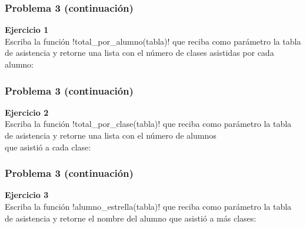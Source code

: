 \documentclass[12pt]{beamer}
\begin{document}
  \begin{frame}
    \frametitle{Problema 3 (continuación)}
    \label{problema-asistencia-2}
    \textbf{Ejercicio 1} \\
    Escriba la función \li!total_por_alumno(tabla)!
    que reciba como parámetro la tabla de asistencia
    y retorne una lista con el número de clases
    asistidas por cada alumno:
    
  \end{frame}

  \begin{frame}
    \frametitle{Problema 3 (continuación)}
    \label{problema-asistencia-3}
    \textbf{Ejercicio 2} \\
    Escriba la función \li!total_por_clase(tabla)!
    que reciba como parámetro la tabla de asistencia
    y retorne una lista con el número de alumnos \\
    que asistió a cada clase:
    
  \end{frame}

  \begin{frame}
    \frametitle{Problema 3 (continuación)}
    \label{problema-asistencia-4}
    \textbf{Ejercicio 3} \\
    Escriba la función \li!alumno_estrella(tabla)!
    que reciba como parámetro la tabla de asistencia
    y retorne el nombre del alumno que asistió a más clases:
    
  \end{frame}
\end{document}
